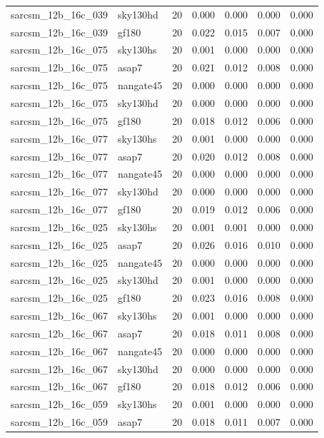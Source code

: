 \begin{tabular}{llrrrrr}
sarcsm\_12b\_16c\_039 & sky130hd & 20 & 0.000 & 0.000 & 0.000 & 0.000 \\
sarcsm\_12b\_16c\_039 & gf180 & 20 & 0.022 & 0.015 & 0.007 & 0.000 \\
sarcsm\_12b\_16c\_075 & sky130hs & 20 & 0.001 & 0.000 & 0.000 & 0.000 \\
sarcsm\_12b\_16c\_075 & asap7 & 20 & 0.021 & 0.012 & 0.008 & 0.000 \\
sarcsm\_12b\_16c\_075 & nangate45 & 20 & 0.000 & 0.000 & 0.000 & 0.000 \\
sarcsm\_12b\_16c\_075 & sky130hd & 20 & 0.000 & 0.000 & 0.000 & 0.000 \\
sarcsm\_12b\_16c\_075 & gf180 & 20 & 0.018 & 0.012 & 0.006 & 0.000 \\
sarcsm\_12b\_16c\_077 & sky130hs & 20 & 0.001 & 0.000 & 0.000 & 0.000 \\
sarcsm\_12b\_16c\_077 & asap7 & 20 & 0.020 & 0.012 & 0.008 & 0.000 \\
sarcsm\_12b\_16c\_077 & nangate45 & 20 & 0.000 & 0.000 & 0.000 & 0.000 \\
sarcsm\_12b\_16c\_077 & sky130hd & 20 & 0.000 & 0.000 & 0.000 & 0.000 \\
sarcsm\_12b\_16c\_077 & gf180 & 20 & 0.019 & 0.012 & 0.006 & 0.000 \\
sarcsm\_12b\_16c\_025 & sky130hs & 20 & 0.001 & 0.001 & 0.000 & 0.000 \\
sarcsm\_12b\_16c\_025 & asap7 & 20 & 0.026 & 0.016 & 0.010 & 0.000 \\
sarcsm\_12b\_16c\_025 & nangate45 & 20 & 0.000 & 0.000 & 0.000 & 0.000 \\
sarcsm\_12b\_16c\_025 & sky130hd & 20 & 0.001 & 0.000 & 0.000 & 0.000 \\
sarcsm\_12b\_16c\_025 & gf180 & 20 & 0.023 & 0.016 & 0.008 & 0.000 \\
sarcsm\_12b\_16c\_067 & sky130hs & 20 & 0.001 & 0.000 & 0.000 & 0.000 \\
sarcsm\_12b\_16c\_067 & asap7 & 20 & 0.018 & 0.011 & 0.008 & 0.000 \\
sarcsm\_12b\_16c\_067 & nangate45 & 20 & 0.000 & 0.000 & 0.000 & 0.000 \\
sarcsm\_12b\_16c\_067 & sky130hd & 20 & 0.000 & 0.000 & 0.000 & 0.000 \\
sarcsm\_12b\_16c\_067 & gf180 & 20 & 0.018 & 0.012 & 0.006 & 0.000 \\
sarcsm\_12b\_16c\_059 & sky130hs & 20 & 0.001 & 0.000 & 0.000 & 0.000 \\
sarcsm\_12b\_16c\_059 & asap7 & 20 & 0.018 & 0.011 & 0.007 & 0.000 \\

\end{tabular}

